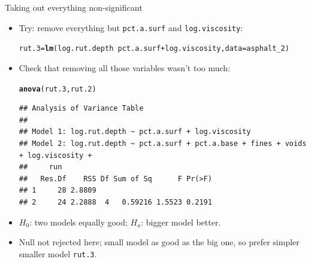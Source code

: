 \documentclass[unknownkeysallowed]{beamer}\usepackage[]{graphicx}\usepackage[]{color}
\makeatletter
\newcommand{\hlopt}[1]{\textcolor[rgb]{0,0,0}{#1}}%
\newcommand{\hlstd}[1]{\textcolor[rgb]{0.345,0.345,0.345}{#1}}%
\newcommand{\hlkwb}[1]{\textcolor[rgb]{0.69,0.353,0.396}{#1}}%
\newcommand{\hlkwc}[1]{\textcolor[rgb]{0.333,0.667,0.333}{#1}}%
\newcommand{\hlkwd}[1]{\textcolor[rgb]{0.737,0.353,0.396}{\textbf{#1}}}%
\newenvironment{kframe}{%
 \def\at@end@of@kframe{}%
 \ifinner\ifhmode%
  \def\at@end@of@kframe{\end{minipage}}%
  \begin{minipage}{\columnwidth}%
 \fi\fi%
 \def\FrameCommand##1{\hskip\@totalleftmargin \hskip-\fboxsep
 \colorbox{shadecolor}{##1}\hskip-\fboxsep
     \hskip-\linewidth \hskip-\@totalleftmargin \hskip\columnwidth}%
 \MakeFramed {\advance\hsize-\width
   \@totalleftmargin\z@ \linewidth\hsize
   \@setminipage}}%
 {\par\unskip\endMakeFramed%
 \at@end@of@kframe}
\newenvironment{knitrout}{}{} %
\makeatother
\begin{document}
\begin{frame}[fragile]{Taking out everything non-significant}

  \begin{itemize}
  \item Try: remove everything but \texttt{pct.a.surf}
and \texttt{log.viscosity}:

\begin{footnotesize}
\begin{knitrout}
\color{fgcolor}\begin{kframe}
\begin{alltt}
\hlstd{rut.3}\hlkwb{=}\hlkwd{lm}\hlstd{(log.rut.depth}\hlopt{~}\hlstd{pct.a.surf}\hlopt{+}\hlstd{log.viscosity,}\hlkwc{data}\hlstd{=asphalt_2)}
\end{alltt}
\end{kframe}
\end{knitrout}
\end{footnotesize}

\item Check that removing all those variables wasn't too much:

\begin{footnotesize}
\begin{knitrout}
\color{fgcolor}\begin{kframe}
\begin{alltt}
\hlkwd{anova}\hlstd{(rut.3,rut.2)}
\end{alltt}
\begin{verbatim}
## Analysis of Variance Table
## 
## Model 1: log.rut.depth ~ pct.a.surf + log.viscosity
## Model 2: log.rut.depth ~ pct.a.surf + pct.a.base + fines + voids + log.viscosity + 
##     run
##   Res.Df    RSS Df Sum of Sq      F Pr(>F)
## 1     28 2.8809                           
## 2     24 2.2888  4   0.59216 1.5523 0.2191
\end{verbatim}
\end{kframe}
\end{knitrout}
\end{footnotesize}

\item $H_0$: two models equally good; $H_a$: bigger model better.
\item Null not rejected here; small model as good as the big one, so
  prefer simpler smaller model \texttt{rut.3}.
  \end{itemize}
  

\end{frame}
\end{document}

